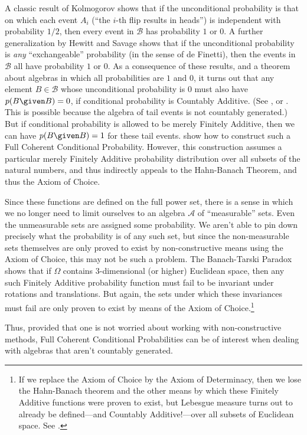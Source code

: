 A classic result of Kolmogorov shows that if the unconditional probability is that on which each event $A_i$ (``the $i$-th flip results in heads'') is independent with probability $1/2$, then every event in $\mathcal{B}$ has probability $1$ or $0$. A further generalization by Hewitt and Savage shows that if the unconditional probability is \emph{any} ``exchangeable'' probability (in the sense of de Finetti), then the events in $\mathcal{B}$ all have probability $1$ or $0$. As a consequence of these results, and a theorem about algebras in which all probabilities are $1$ and $0$, it turns out that any element $B\in\mathcal{B}$ whose unconditional probability is $0$ must also have $p(B \given B)=0$, if conditional probability is Countably Additive. (See \citealp{blackwelldubins}, or \citealp{improper}. This is possible because the algebra of tail events is not countably generated.) But if conditional probability is allowed to be merely Finitely Additive, then we can have $p(B \given B)=1$ for these tail events. \citet{dubinstail} show how to construct such a Full Coherent Conditional Probability. However, this construction assumes a particular merely Finitely Additive probability distribution over all subsets of the natural numbers, and thus indirectly appeals to the Hahn-Banach Theorem, and thus the Axiom of Choice.

Since these functions are defined on the full power set, there is a sense in which we no longer need to limit ourselves to an algebra $\mathcal{A}$ of ``measurable'' sets. Even the unmeasurable sets are assigned some probability. We aren't able to pin down precisely what the probability is of any such set, but since the non-measurable sets themselves are only proved to exist by non-constructive means using the Axiom of Choice, this may not be such a problem. The Banach-Tarski Paradox shows that if $\Omega$ contains $3$-dimensional (or higher) Euclidean space, then any such Finitely Additive probability function must fail to be invariant under rotations and translations. But again, the sets under which these invariances must fail are only proven to exist by means of the Axiom of Choice.\footnote{If we replace the Axiom of Choice by the Axiom of Determinacy, then we lose the Hahn-Banach theorem and the other means by which these Finitely Additive functions were proven to exist, but Lebesgue measure turns out to already be defined---and Countably Additive!---over all subsets of Euclidean space. See \citet[Section 8]{bingham}.}

Thus, provided that one is not worried about working with non-constructive methods, Full Coherent Conditional Probabilities can be of interest when dealing with algebras that aren't countably generated.

